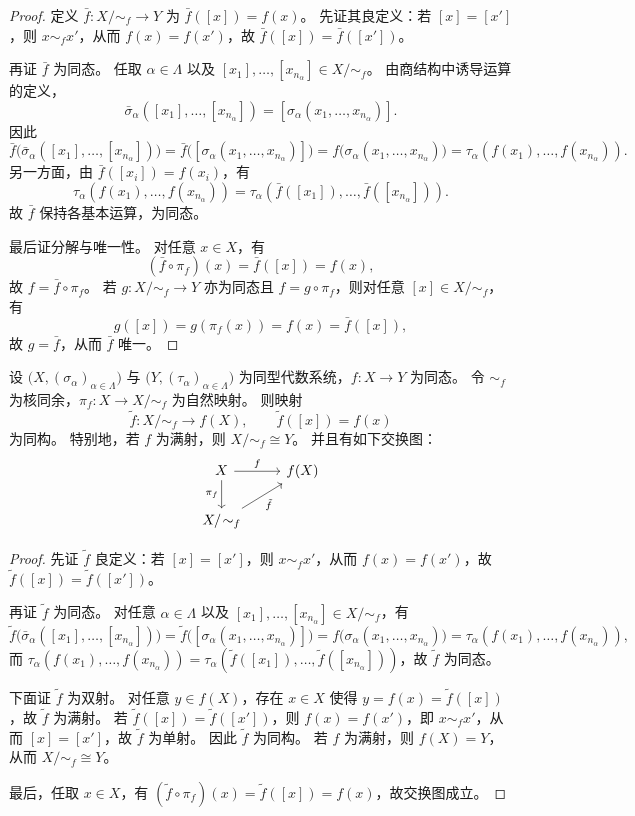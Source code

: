 \documentclass[lang=cn,a4paper,newtx]{elegantbook}
\begin{document}
\begin{proof}
定义 $\bar f:X/\!\sim_f\to Y$ 为 $\bar f([x])=f(x)$。
先证其良定义：若 $[x]=[x']$，则 $x\sim_f x'$，从而 $f(x)=f(x')$，故 $\bar f([x])=\bar f([x'])$。

再证 $\bar f$ 为同态。
任取 $\alpha\in\Lambda$ 以及 $[x_1],\dots,[x_{n_{\alpha}}]\in X/\!\sim_f$。
由商结构中诱导运算的定义，
\[
  \bar\sigma_{\alpha}([x_1],\dots,[x_{n_{\alpha}}])=[\sigma_{\alpha}(x_1,\dots,x_{n_{\alpha}})].
\]
因此
\[
  \bar f\bigl(\bar\sigma_{\alpha}([x_1],\dots,[x_{n_{\alpha}}])\bigr)=\bar f\bigl([\sigma_{\alpha}(x_1,\dots,x_{n_{\alpha}})]\bigr)=f\bigl(\sigma_{\alpha}(x_1,\dots,x_{n_{\alpha}})\bigr)=\tau_{\alpha}(f(x_1),\dots,f(x_{n_{\alpha}})).
\]
另一方面，由 $\bar f([x_i])=f(x_i)$，有
\[
  \tau_{\alpha}(f(x_1),\dots,f(x_{n_{\alpha}}))=\tau_{\alpha}(\bar f([x_1]),\dots,\bar f([x_{n_{\alpha}}])).
\]
故 $\bar f$ 保持各基本运算，为同态。

最后证分解与唯一性。
对任意 $x\in X$，有
\[
  (\bar f\circ\pi_f)(x)=\bar f([x])=f(x),
\]
故 $f=\bar f\circ\pi_f$。
若 $g:X/\!\sim_f\to Y$ 亦为同态且 $f=g\circ\pi_f$，则对任意 $[x]\in X/\!\sim_f$，有
\[
  g([x])=g(\pi_f(x))=f(x)=\bar f([x]),
\]
故 $g=\bar f$，从而 $\bar f$ 唯一。
\end{proof}

\begin{proposition}
设 $\bigl(X,(\sigma_{\alpha})_{\alpha\in\Lambda}\bigr)$ 与 $\bigl(Y,(\tau_{\alpha})_{\alpha\in\Lambda}\bigr)$ 为同型代数系统，$f:X\to Y$ 为同态。
令 $\sim_f$ 为核同余，$\pi_f:X\to X/\!\sim_f$ 为自然映射。
则映射
\[
  \tilde f:X/\!\sim_f\to f(X),\qquad \tilde f([x])=f(x)
\]
为同构。
特别地，若 $f$ 为满射，则 $X/\!\sim_f\cong Y$。
并且有如下交换图：
\[
\begin{tikzcd}
 X \arrow[r,"f"] \arrow[d,"\pi_f"'] & f(X) \\
 X/\!\sim_f \arrow[ur,"\tilde f"']
\end{tikzcd}
\]
\end{proposition}

\begin{proof}
先证 $\tilde f$ 良定义：若 $[x]=[x']$，则 $x\sim_f x'$，从而 $f(x)=f(x')$，故 $\tilde f([x])=\tilde f([x'])$。

再证 $\tilde f$ 为同态。
对任意 $\alpha\in\Lambda$ 以及 $[x_1],\dots,[x_{n_{\alpha}}]\in X/\!\sim_f$，有
\[
  \tilde f\bigl(\bar\sigma_{\alpha}([x_1],\dots,[x_{n_{\alpha}}])\bigr)=\tilde f\bigl([\sigma_{\alpha}(x_1,\dots,x_{n_{\alpha}})]\bigr)=f\bigl(\sigma_{\alpha}(x_1,\dots,x_{n_{\alpha}})\bigr)=\tau_{\alpha}(f(x_1),\dots,f(x_{n_{\alpha}})),
\]
而 $\tau_{\alpha}(f(x_1),\dots,f(x_{n_{\alpha}}))=\tau_{\alpha}(\tilde f([x_1]),\dots,\tilde f([x_{n_{\alpha}}]))$，故 $\tilde f$ 为同态。

下面证 $\tilde f$ 为双射。
对任意 $y\in f(X)$，存在 $x\in X$ 使得 $y=f(x)=\tilde f([x])$，故 $\tilde f$ 为满射。
若 $\tilde f([x])=\tilde f([x'])$，则 $f(x)=f(x')$，即 $x\sim_f x'$，从而 $[x]=[x']$，故 $\tilde f$ 为单射。
因此 $\tilde f$ 为同构。
若 $f$ 为满射，则 $f(X)=Y$，从而 $X/\!\sim_f\cong Y$。

最后，任取 $x\in X$，有 $(\tilde f\circ\pi_f)(x)=\tilde f([x])=f(x)$，故交换图成立。
\end{proof}
\end{document}
